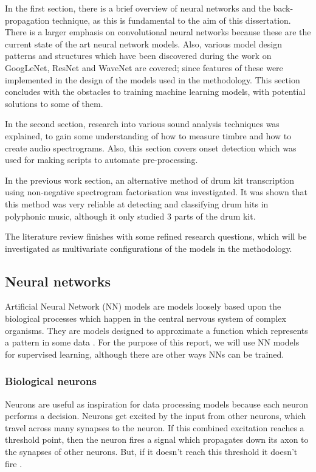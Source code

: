 \documentclass[12pt]{article}
\begin{document}
	In the first section, there is a brief overview of neural networks and the back-propagation technique, as this is fundamental to the aim of this dissertation. There is a larger emphasis on convolutional neural networks because these are the current state of the art neural network models. Also, various model design patterns and structures which have been discovered during the work on GoogLeNet, ResNet and WaveNet are covered; since features of these were implemented in the design of the models used in the methodology. This section concludes with the obstacles to training machine learning models, with potential solutions to some of them.\medskip
	
	In the second section, research into various sound analysis techniques was explained, to gain some understanding of how to measure timbre and how to create audio spectrograms. Also, this section covers onset detection which was used for making scripts to automate pre-processing.
	
	In the previous work section, an alternative method of drum kit transcription using non-negative spectrogram factorisation was investigated. It was shown that this method was very reliable at detecting and classifying drum hits in polyphonic music, although it only studied 3 parts of the drum kit.
	
	The literature review finishes with some refined research questions, which will be investigated as multivariate configurations of the models in the methodology. 
	
	\subsection{Neural networks}
	\label{sec:neural_networks}
	
	Artificial Neural Network (NN) models are models loosely based upon the biological processes which happen in the central nervous system of complex organisms. They are models designed to approximate a function which represents a pattern in some data \parencite{Russell;Norvig1995}. For the purpose of this report, we will use NN models for supervised learning, although there are other ways NNs can be trained.
	
	\subsubsection{Biological neurons}
	\label{sec:biological_neurons}
	
	Neurons are useful as inspiration for data processing models because each neuron performs a decision. Neurons get excited by the input from other neurons, which travel across many synapses to the neuron. If this combined excitation reaches a threshold point, then the neuron fires a signal which propagates down its axon to the synapses of other neurons. But, if it doesn't reach this threshold it doesn't fire \parencite[p.18-20]{Rojas}. 
	
\end{document}
